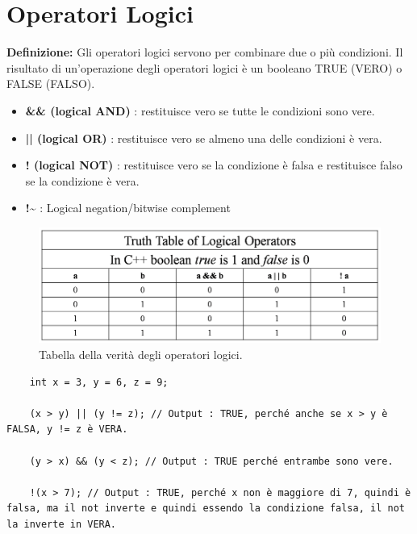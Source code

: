 
\section{Operatori Logici}

\textsf{\small \textbf{Definizione: } Gli operatori logici servono per combinare due o più condizioni. Il risultato di un'operazione degli operatori logici è un booleano TRUE (VERO) o FALSE (FALSO).} \\

\begin{itemize}
	\item \textsf{\small \textbf{\&\& (logical AND)} : restituisce vero se tutte le condizioni sono vere.}
	\item \textsf{\small \textbf{|| (logical OR)} : restituisce vero se almeno una delle condizioni è vera.}
	\item \textsf{\small \textbf{! (logical NOT)} : restituisce vero se la condizione è falsa e restituisce falso se la condizione è vera.}
	\item \textsf{\small \textbf{!\textasciitilde} : Logical negation/bitwise complement} 
\end{itemize}

\begin{figure}[H]
	\centering
	\includegraphics[width=1\textwidth, height=1\textheight, keepaspectratio]{./imgs/logical_operators_truth_table.png}
	\caption{Tabella della verità degli operatori logici.}
	\label{fig:logical_operators_truth_table}
\end{figure}

\begin{lstlisting}
	int x = 3, y = 6, z = 9;
	
	(x > y) || (y != z); // Output : TRUE, perché anche se x > y è FALSA, y != z è VERA.
	
	(y > x) && (y < z); // Output : TRUE perché entrambe sono vere.
	
	!(x > 7); // Output : TRUE, perché x non è maggiore di 7, quindi è falsa, ma il not inverte e quindi essendo la condizione falsa, il not la inverte in VERA.
	
\end{lstlisting}

